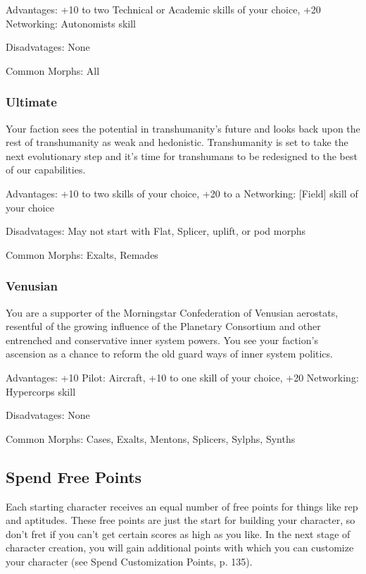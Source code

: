 Advantages: +10 to two Technical or Academic skills of your choice, +20 Networking: Autonomists skill 

Disadvatages: None 

Common Morphs: All 

\subsubsection{Ultimate} \label{sec:ultimate} 

Your faction sees the potential in transhumanity’s future and looks back upon the rest of transhumanity as weak and hedonistic. Transhumanity is set to take the next evolutionary step and it’s time for transhumans to be redesigned to the best of our capabilities. 

Advantages: +10 to two skills of your choice, +20 to a Networking: [Field] skill of your choice 

Disadvatages: May not start with Flat, Splicer, uplift, or pod morphs 

Common Morphs: Exalts, Remades 

\subsubsection{Venusian} \label{sec:venusian} 

You are a supporter of the Morningstar Confederation of Venusian aerostats, resentful of the growing influence of the Planetary Consortium and other entrenched and conservative inner system powers. You see your faction’s ascension as a chance to reform the old guard ways of inner system politics. 

Advantages: +10 Pilot: Aircraft, +10 to one skill of your choice, +20 Networking: Hypercorps skill 

Disadvatages: None 

Common Morphs: Cases, Exalts, Mentons, Splicers, Sylphs, Synths 

\subsection{Spend Free Points} \label{sec:spend-free-points} 

Each starting character receives an equal number of free points for things like rep and aptitudes. These free points are just the start for building your character, so don’t fret if you can’t get certain scores as high as you like. In the next stage of character creation, you will gain additional points with which you can customize your character (see Spend Customization Points, p. 135). 





